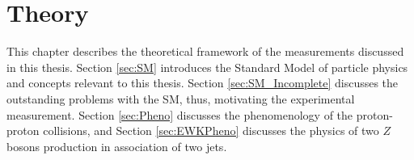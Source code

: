 \part{\LARGE{Theory}}
\label{sec:theory}

This chapter describes the theoretical framework of the measurements discussed in this thesis. Section  \ref{sec:SM} introduces the Standard Model of particle physics and concepts relevant to this thesis. Section \ref{sec:SM_Incomplete} discusses the outstanding problems with the SM, thus, motivating the experimental measurement. Section \ref{sec:Pheno} discusses the phenomenology of the proton-proton collisions, and Section \ref{sec:EWKPheno} discusses the physics of two $Z$ bosons production in association of two jets. 